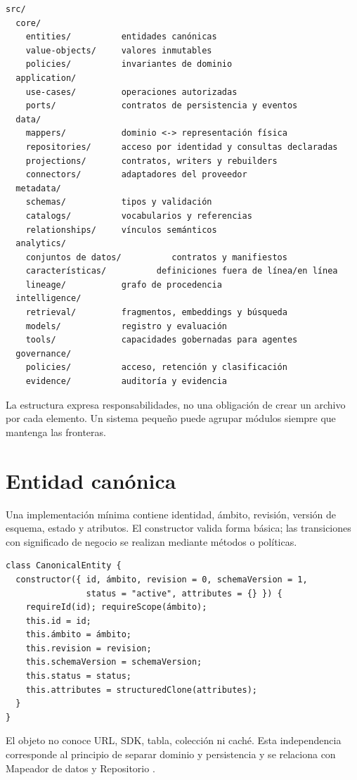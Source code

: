 \begin{verbatim}
src/
  core/
    entities/          entidades canónicas
    value-objects/     valores inmutables
    policies/          invariantes de dominio
  application/
    use-cases/         operaciones autorizadas
    ports/             contratos de persistencia y eventos
  data/
    mappers/           dominio <-> representación física
    repositories/      acceso por identidad y consultas declaradas
    projections/       contratos, writers y rebuilders
    connectors/        adaptadores del proveedor
  metadata/
    schemas/           tipos y validación
    catalogs/          vocabularios y referencias
    relationships/     vínculos semánticos
  analytics/
    conjuntos de datos/          contratos y manifiestos
    características/          definiciones fuera de línea/en línea
    lineage/           grafo de procedencia
  intelligence/
    retrieval/         fragmentos, embeddings y búsqueda
    models/            registro y evaluación
    tools/             capacidades gobernadas para agentes
  governance/
    policies/          acceso, retención y clasificación
    evidence/          auditoría y evidencia
\end{verbatim}

La estructura expresa responsabilidades, no una obligación de crear un archivo por cada
elemento. Un sistema pequeño puede agrupar módulos siempre que mantenga las fronteras.

\section{Entidad canónica}

Una implementación mínima contiene identidad, ámbito, revisión, versión de esquema,
estado y atributos. El constructor valida forma básica; las transiciones con significado
de negocio se realizan mediante métodos o políticas.

\begin{verbatim}
class CanonicalEntity {
  constructor({ id, ámbito, revision = 0, schemaVersion = 1,
                status = "active", attributes = {} }) {
    requireId(id); requireScope(ámbito);
    this.id = id;
    this.ámbito = ámbito;
    this.revision = revision;
    this.schemaVersion = schemaVersion;
    this.status = status;
    this.attributes = structuredClone(attributes);
  }
}
\end{verbatim}

El objeto no conoce URL, SDK, tabla, colección ni caché. Esta independencia corresponde
al principio de separar dominio y persistencia y se relaciona con Mapeador de datos y
Repositorio \parencite{fowler2002poeaa}.

